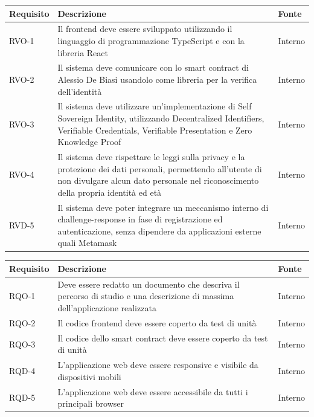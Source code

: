 \begin{center}
\label{tab:requisiti-vincolo}
\begin{tabularx}{\textwidth}{|>{\hsize=0.4\hsize\centering\arraybackslash}X|>{\hsize=2.2\hsize\centering}X|>{\hsize=0.4\hsize\centering\arraybackslash}X|}
\hline
\textbf{Requisito} & \textbf{Descrizione} & \textbf{Fonte}\\
\hline
RVO-1 & Il frontend deve essere sviluppato utilizzando il linguaggio di programmazione TypeScript e con la libreria React & Interno \\
\hline
RVO-2 & Il sistema deve comunicare con lo smart contract di Alessio De Biasi usandolo come libreria per la verifica dell'identità & Interno \\
\hline
RVO-3 & Il sistema deve utilizzare un'implementazione di Self Sovereign Identity, utilizzando Decentralized Identifiers, Verifiable Credentials, Verifiable Presentation e Zero Knowledge Proof & Interno \\
\hline
RVO-4 & Il sistema deve rispettare le leggi sulla privacy e la protezione dei dati personali, permettendo all'utente di non divulgare alcun dato personale nel riconoscimento della propria identità ed età & Interno \\
\hline
RVD-5 & Il sistema deve poter integrare un meccanismo interno di challenge-response in fase di registrazione ed autenticazione, senza dipendere da applicazioni esterne quali Metamask & Interno \\
\hline
\end{tabularx}
\end{center}
  
\begin{center}
\label{tab:requisiti-qualitativi}
\begin{tabularx}{\textwidth}{|>{\hsize=0.4\hsize\centering\arraybackslash}X|>{\hsize=2.2\hsize\centering}X|>{\hsize=0.4\hsize\centering\arraybackslash}X|}
\hline
\textbf{Requisito} & \textbf{Descrizione} & \textbf{Fonte} \\
\hline
RQO-1    & Deve essere redatto un documento che descriva il percorso di studio e una descrizione di massima dell'applicazione realizzata & Interno \\
\hline
RQO-2    & Il codice frontend deve essere coperto da test di unità & Interno \\
\hline
RQO-3    & Il codice dello smart contract deve essere coperto da test di unità & Interno \\
\hline
RQD-4    & L'applicazione web deve essere responsive e visibile da dispositivi mobili & Interno \\
\hline
RQD-5    & L'applicazione web deve essere accessibile da tutti i principali browser & Interno \\
\hline
\end{tabularx}
\end{center}